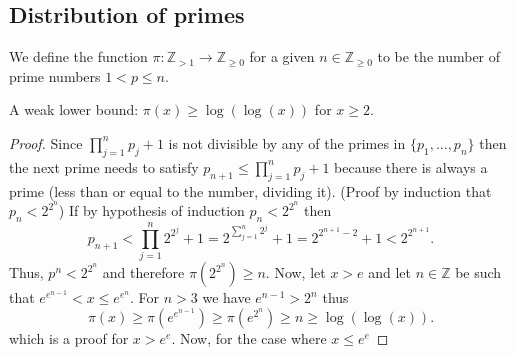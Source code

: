 \subsection{Distribution of primes}

\begin{definition}
    We define the function \(\pi: \mathbb{Z}_{>1} \to
    \mathbb{Z}_{\geqslant 0}\) for a given \(n \in \mathbb{Z}_{\geqslant 0}\) to
    be the number of prime numbers \(1 < p \leqslant n\).
\end{definition}

\begin{theorem}
    A weak lower bound: \(\pi(x) \geqslant \log(\log(x))\) for \(x \geqslant 2\).
\end{theorem}

\begin{proof}
    Since \(\prod_{j=1}^n p_j + 1\) is not divisible by any of the primes in
    \(\{p_1, \dots, p_n\} \) then the next prime needs to satisfy \(p_{n+1}
    \leqslant \prod_{j=1}^n p_j + 1\) because there is always a prime (less than
    or equal to the number, dividing it). (Proof by induction that \(p_n <
    2^{2^n}\)) If by hypothesis of induction \(p_n < 2^{2^n}\) then
    \[
        p_{n+1} < \prod_{j=1}^n 2^{2^j} + 1 = 2^{\sum_{j=1}^n 2^j} + 1 =
        2^{2^{n+1} - 2}+1 < 2^{2^{n+1}}.
    \]
    Thus, \(p^n < 2^{2^n}\) and therefore \(\pi(2^{2^n}) \geqslant n\). Now, let
    \(x > e\) and let \(n \in \mathbb{Z}\) be such that \(e^{e^{n-1}} < x
    \leqslant e^{e^n}\). For \(n > 3\) we have \(e^{n-1} > 2^n\) thus
    \[
        \pi(x) \geqslant  \pi(e^{e^{n-1}}) \geqslant  \pi(e^{2^n}) \geqslant n
        \geqslant \log(\log(x)).
    \]
    which is a proof for \(x > e^e\). Now, for the case where \(x \leqslant e^e\)

\end{proof}
